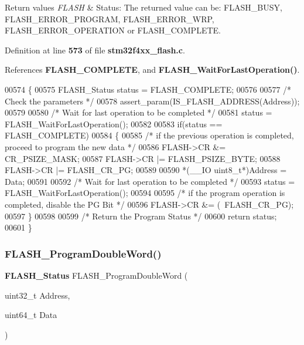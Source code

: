 \begin{DoxyRetVals}{Return values}
{\em F\+L\+A\+SH} & Status\+: The returned value can be\+: F\+L\+A\+S\+H\+\_\+\+B\+U\+SY, F\+L\+A\+S\+H\+\_\+\+E\+R\+R\+O\+R\+\_\+\+P\+R\+O\+G\+R\+AM, F\+L\+A\+S\+H\+\_\+\+E\+R\+R\+O\+R\+\_\+\+W\+RP, F\+L\+A\+S\+H\+\_\+\+E\+R\+R\+O\+R\+\_\+\+O\+P\+E\+R\+A\+T\+I\+ON or F\+L\+A\+S\+H\+\_\+\+C\+O\+M\+P\+L\+E\+TE. \\
\hline
\end{DoxyRetVals}


Definition at line \textbf{ 573} of file \textbf{ stm32f4xx\+\_\+flash.\+c}.



References \textbf{ F\+L\+A\+S\+H\+\_\+\+C\+O\+M\+P\+L\+E\+TE}, and \textbf{ F\+L\+A\+S\+H\+\_\+\+Wait\+For\+Last\+Operation()}.


\begin{DoxyCode}
00574 \{
00575   FLASH_Status status = FLASH_COMPLETE;
00576 
00577   \textcolor{comment}{/* Check the parameters */}
00578   assert_param(IS_FLASH_ADDRESS(Address));
00579 
00580   \textcolor{comment}{/* Wait for last operation to be completed */}
00581   status = FLASH_WaitForLastOperation();
00582   
00583   \textcolor{keywordflow}{if}(status == FLASH_COMPLETE)
00584   \{
00585     \textcolor{comment}{/* if the previous operation is completed, proceed to program the new data */}
00586     FLASH->CR &= CR_PSIZE_MASK;
00587     FLASH->CR |= FLASH_PSIZE_BYTE;
00588     FLASH->CR |= FLASH_CR_PG;
00589   
00590     *(\_\_IO uint8\_t*)Address = Data;
00591         
00592     \textcolor{comment}{/* Wait for last operation to be completed */}
00593     status = FLASH_WaitForLastOperation();
00594 
00595     \textcolor{comment}{/* if the program operation is completed, disable the PG Bit */}
00596     FLASH->CR &= (~FLASH_CR_PG);
00597   \} 
00598 
00599   \textcolor{comment}{/* Return the Program Status */}
00600   \textcolor{keywordflow}{return} status;
00601 \}
\end{DoxyCode}
\mbox{\label{group__FLASH_gab84b52121e58d0dbc8ff2a92145d20f2}} 
\subsubsection{F\+L\+A\+S\+H\+\_\+\+Program\+Double\+Word()}
{\footnotesize\ttfamily \textbf{ F\+L\+A\+S\+H\+\_\+\+Status} F\+L\+A\+S\+H\+\_\+\+Program\+Double\+Word (\begin{DoxyParamCaption}\item[{uint32\+\_\+t}]{Address,  }\item[{uint64\+\_\+t}]{Data }\end{DoxyParamCaption})}



